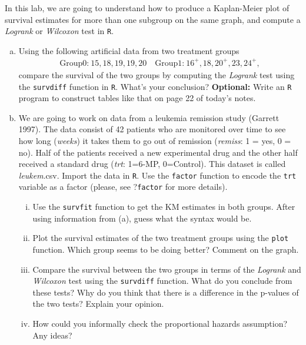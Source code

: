 In this lab, we are going to understand how to produce a Kaplan-Meier 
plot of survival estimates for more than one subgroup on the same graph, and 
compute a \emph{Logrank} or \emph{Wilcoxon} test in \verb|R|.
\begin{enumerate}[(a)]
 \item Using the following artificial data from two treatment groups
 \begin{align}
 \text{Group0:}\ 15, 18, 19, 19, 20 
 \quad \text{Group1:}\ 16^{+}, 18, 20^{+}, 23, 24^{+}, \nonumber
 \end{align}
 compare the survival of the two groups by computing the \emph{Logrank} test using the \verb|survdiff| function in \verb|R|. What's your conclusion? \textbf{Optional:} Write an \verb|R| program to construct tables like that on page 22 of today's notes.
 \item We are going to work on data from a leukemia remission study (Garrett 
1997). The data consist of 42
patients who are monitored over time to see how long (\emph{weeks}) it takes them to go out of remission
(\emph{remiss}: 1 = yes, 0 = no). Half of 
the patients received a new experimental drug and the other half received a 
standard drug (\emph{trt}: 1=6-MP, 0=Control). This dataset is called \emph{leukem}.csv. Import the data in \verb|R|. Use the \verb|factor| function to encode the \verb|trt| variable as a factor (please, see ?\verb|factor| for more details).
\begin{enumerate}[(i)]
\item Use the \verb|survfit| function to get the KM estimates in both groups. After using information from (a), guess what the syntax would be.
\item Plot the survival estimates of the two treatment groups using the 
\verb|plot| function. Which group seems to be doing better? Comment on the graph.
\item Compare the survival between the two groups in terms of the \emph{Logrank} and \emph{Wilcoxon} test using the \verb|survdiff| function. What do you conclude from these tests? Why do you think that there is a difference in the p-values of the two tests? Explain your opinion.
\item How could you informally check the proportional hazards assumption? Any ideas?
\end{enumerate}
 
\end{enumerate}